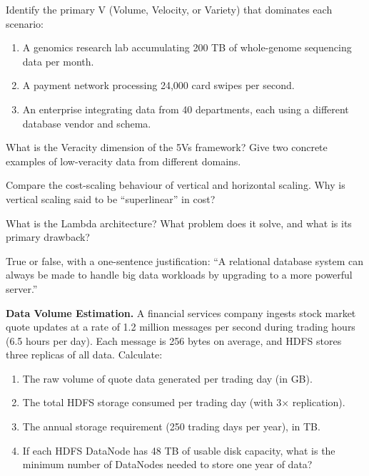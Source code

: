 \sq Identify the primary V (Volume, Velocity, or Variety) that dominates
each scenario:
\begin{enumerate}[label=(\alph*)]
  \item A genomics research lab accumulating 200 TB of whole-genome
        sequencing data per month.
  \item A payment network processing 24,000 card swipes per second.
  \item An enterprise integrating data from 40 departments, each using
        a different database vendor and schema.
\end{enumerate}

\sq What is the Veracity dimension of the 5Vs framework? Give two
concrete examples of low-veracity data from different domains.

\sq Compare the cost-scaling behaviour of vertical and horizontal scaling.
Why is vertical scaling said to be ``superlinear'' in cost?

\sq What is the Lambda architecture? What problem does it solve, and what
is its primary drawback?

\sq True or false, with a one-sentence justification: ``A relational
database system can always be made to handle big data workloads by
upgrading to a more powerful server.''

\bigskip
{}

\ap \textbf{Data Volume Estimation.}
A financial services company ingests stock market quote updates at a rate
of 1.2 million messages per second during trading hours (6.5 hours per
day). Each message is 256 bytes on average, and HDFS stores three
replicas of all data. Calculate:
\begin{enumerate}[label=(\alph*)]
  \item The raw volume of quote data generated per trading day (in GB).
  \item The total HDFS storage consumed per trading day (with 3$\times$ replication).
  \item The annual storage requirement (250 trading days per year), in TB.
  \item If each HDFS DataNode has 48 TB of usable disk capacity, what is
        the minimum number of DataNodes needed to store one year of data?
\end{enumerate}

